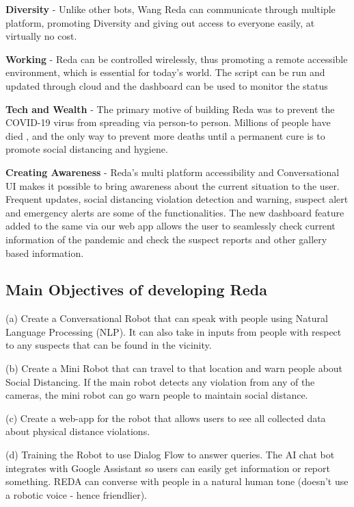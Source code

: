 \documentclass[AMA,STIX1COL]{WileyNJD-v2}
\begin{document}
\textbf {Diversity} - Unlike other bots, Wang Reda can communicate through multiple platform, promoting Diversity and giving out access to everyone easily, at virtually no cost. 

\textbf {Working} - Reda can be controlled wirelessly, thus promoting a remote accessible environment, which is essential for today’s world. The script can be run and updated through cloud and the dashboard can be used to monitor the status

\textbf {Tech and Wealth} - The primary motive of building Reda was to prevent the COVID-19 virus from spreading via person-to person. Millions of people have died \cite{b11}, and the only way to prevent more deaths until a permanent cure is to promote social distancing and hygiene. 

 \textbf {Creating Awareness} - Reda’s multi platform accessibility and Conversational UI makes it possible to bring awareness about the current situation to the user. Frequent updates, social distancing violation detection and warning, suspect alert and emergency alerts are some of the functionalities. The new dashboard feature added to the same via our web app allows the user to seamlessly check current information of the pandemic and check the suspect reports and other gallery based information.


\subsection{Main Objectives of developing Reda}

\quad(a) Create a Conversational Robot that can speak with people using Natural Language Processing (NLP). It can also take in inputs from people with respect to any suspects that can be found in the vicinity.

(b) Create a Mini Robot that can travel to that location and warn people about Social Distancing. If the main robot detects any violation from any of the cameras, the mini robot can go warn people to maintain social distance.

(c) Create a web-app for the robot that allows users to see all collected data about physical distance violations.

(d) Training the Robot to use Dialog Flow to answer queries. The AI chat bot integrates with Google Assistant so users can easily get information or report something. REDA can converse with people in a natural human tone (doesn't use a robotic voice - hence friendlier).
\end{document}
